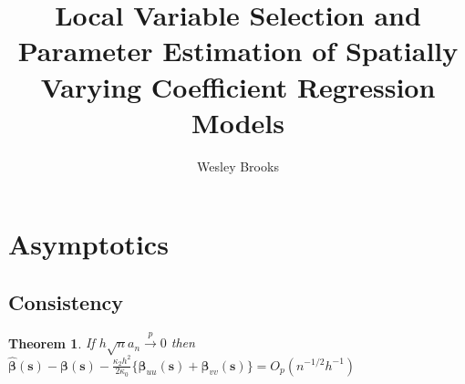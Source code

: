 \documentclass[authoryear, review, 11pt]{elsarticle}
\title{Local Variable Selection and Parameter Estimation of Spatially Varying Coefficient Regression Models}
\author{Wesley Brooks}
\date{}                                           %
\newtheorem{theorem}{Theorem}[section]
\begin{document}

    \maketitle

    \section{Asymptotics}
    \subsection{Consistency}
    \begin{theorem}\label{theorem:consistency}     
        If $h \sqrt{n} a_n \xrightarrow{p} 0$ then $\hat{\bm{\beta}}(\bm{s}) - \bm{\beta}(\bm{s}) - \frac{\kappa_2 h^2}{2 \kappa_0} \{ \bm{\beta}_{uu}(\bm{s}) + \bm{\beta}_{vv}(\bm{s}) \} = O_p(n^{-1/2} h^{-1} )$
    \end{theorem}
  
\end{document}

